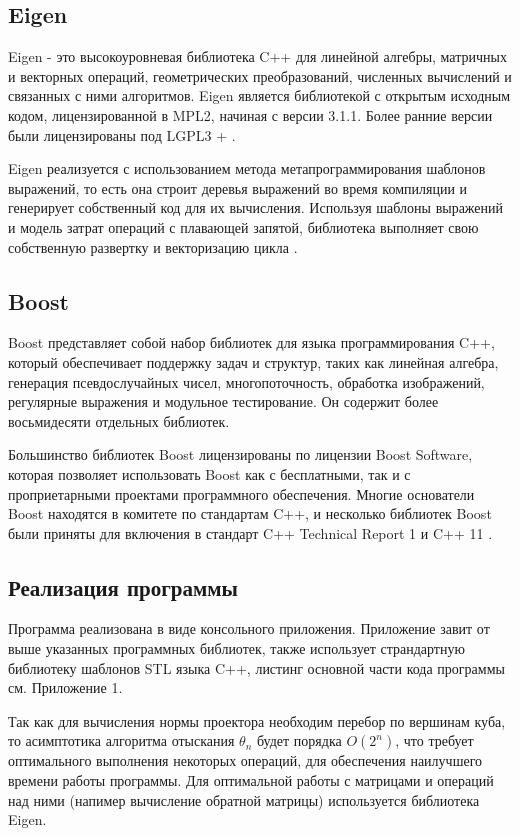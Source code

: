 \documentclass[12pt, a4paper]{extarticle}
\begin{document}
\subsection{Eigen}
Eigen - это высокоуровневая библиотека C++  для линейной алгебры, матричных и векторных операций, геометрических преобразований, численных вычислений и связанных с ними алгоритмов. Eigen является библиотекой с открытым исходным кодом, лицензированной в MPL2, начиная с версии 3.1.1. Более ранние версии были лицензированы под LGPL3 + \cite{3}.

Eigen реализуется с использованием метода метапрограммирования шаблонов выражений, то есть она строит деревья выражений во время компиляции и генерирует собственный код для их вычисления. Используя шаблоны выражений и модель затрат операций с плавающей запятой, библиотека выполняет свою собственную развертку и векторизацию цикла \cite{4}.

\subsection{Boost}
Boost представляет собой набор библиотек для языка программирования C++, который обеспечивает поддержку задач и структур, таких как линейная алгебра, генерация псевдослучайных чисел, многопоточность, обработка изображений, регулярные выражения и модульное тестирование. Он содержит более восьмидесяти отдельных библиотек.

Большинство библиотек Boost лицензированы по лицензии Boost Software, которая позволяет использовать Boost как с бесплатными, так и с проприетарными проектами программного обеспечения. Многие основатели Boost находятся в комитете по стандартам C++, и несколько библиотек Boost были приняты для включения в стандарт C++ Technical Report 1 и C++ 11 \cite{5}.

\subsection{Реализация программы}
Программа реализована в виде консольного приложения. Приложение завит от выше указанных программных библиотек, также использует страндартную библиотеку шаблонов STL языка C++, листинг основной части кода программы см. Приложение 1. 

Так как для вычисления нормы проектора необходим перебор по вершинам куба, то асимптотика алгоритма отыскания $\theta_n$ будет порядка $O(2^n)$, что требует оптимального выполнения некоторых операций, для обеспечения наилучшего времени работы программы. Для оптимальной работы с матрицами и операций над ними (напимер вычисление обратной матрицы) используется библиотека Eigen.
\end{document}
